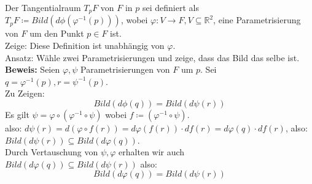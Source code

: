 \begin{problem*}[2a]
Der Tangentialraum $ T_pF$ von $ F $ in $ p $ sei definiert als $ T_pF \coloneqq Bild(d \phi (\varphi^{ -1 }(p))) $, wobei $\varphi: V \to F, V \subseteq \mathbb{ R }^2$, eine Parametrisierung von $ F $ um den Punkt $ p \in F$ ist.\\
Zeige: Diese Definition ist unabhängig von $\varphi$.\\
Ansatz: Wähle zwei Parametrisierungen und zeige, dass das Bild das selbe ist.\\
\textbf{Beweis:} Seien $ \varphi, \psi$ Parametrisierungen von $ F $ um $ p $. Sei $q=\varphi^{ -1 }(p), r=\psi^{ -1 }(p).$\\
Zu Zeigen:
\begin{equation*}
Bild(d \phi(q)) = Bild(d \psi(r))
\end{equation*}
Es gilt $\psi = \varphi \circ (\varphi^{ -1 }\circ \psi)$ wobei $f \coloneqq (\varphi^{ -1 }\circ \psi)$.\\
also: $d \psi(r) = d (\varphi \circ f(r)) = d \varphi(f(r)) \cdot df(r) = d \varphi(q) \cdot df(r)$, also:\\
$Bild(d \psi(r)) \subseteq Bild(d\varphi(q))$.\\
Durch Vertauschung von $ \psi ,\varphi $ erhalten wir auch $Bild(d\varphi(q)) \subseteq Bild(d \psi(r))$ also: 
\begin{equation*}
  Bild(d\varphi(q)) = Bild(d \psi(r))
\end{equation*}
\end{problem*}

